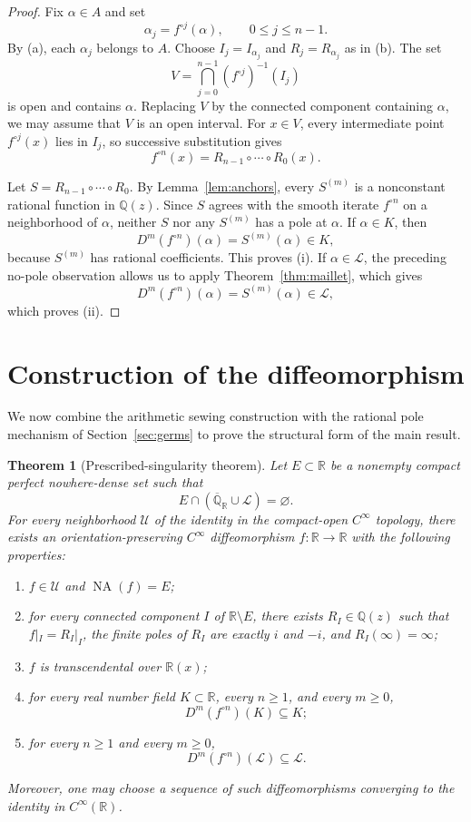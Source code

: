 \documentclass[11pt,reqno]{amsart}
\numberwithin{equation}{section}
\newtheorem{theorem}{Theorem}[section]
\theoremstyle{definition}
\theoremstyle{remark}
\newcommand{\R}{\mathbb R}
\newcommand{\Q}{\mathbb Q}
\newcommand{\Ralg}{\overline{\mathbb Q}_{\mathbb R}}
\newcommand{\Lio}{\mathscr L}
\newcommand{\NA}{\operatorname{NA}}
\begin{document}
\begin{proof}
Fix $\alpha\in A$ and set
\[
 \alpha_j=f^{\circ j}(\alpha),
 \qquad 0\leq j\leq n-1.
\]
By (a), each $\alpha_j$ belongs to $A$.  Choose $I_j=I_{\alpha_j}$ and $R_j=R_{\alpha_j}$ as in (b).  The set
\[
 V=\bigcap_{j=0}^{n-1}(f^{\circ j})^{-1}(I_j)
\]
is open and contains $\alpha$. Replacing $V$ by the connected component
containing $\alpha$, we may assume that $V$ is an open interval. For $x\in V$, every intermediate point $f^{\circ j}(x)$ lies in $I_j$, so successive substitution gives
\[
 f^{\circ n}(x)=R_{n-1}\circ\cdots\circ R_0(x).
\]

Let $S=R_{n-1}\circ\cdots\circ R_0$.  By Lemma~\ref{lem:anchors}, every $S^{(m)}$ is a nonconstant rational function in $\Q(z)$. Since $S$ agrees with the smooth iterate $f^{\circ n}$ on a neighborhood of $\alpha$, neither $S$ nor any $S^{(m)}$ has a pole at $\alpha$. If $\alpha\in K$, then
\[
 D^m(f^{\circ n})(\alpha)=S^{(m)}(\alpha)\in K,
\]
because $S^{(m)}$ has rational coefficients. This proves (i). If $\alpha\in\Lio$, the preceding no-pole observation allows us to apply Theorem~\ref{thm:maillet}, which gives
\[
 D^m(f^{\circ n})(\alpha)=S^{(m)}(\alpha)\in\Lio,
\]
which proves (ii).
\end{proof}

\section{Construction of the diffeomorphism}\label{sec:construction}

We now combine the arithmetic sewing construction with the rational
pole mechanism of Section~\ref{sec:germs} to prove the structural form
of the main result.

\begin{theorem}[Prescribed-singularity theorem]\label{thm:cloaking}
Let $E\subset\R$ be a nonempty compact perfect nowhere-dense set such that
\[
E\cap(\Ralg\cup\Lio)=\varnothing.
\]
For every neighborhood $\mathcal U$ of the identity in the compact-open $C^\infty$ topology, there exists an orientation-preserving $C^\infty$ diffeomorphism $f:\R\to\R$ with the following properties:
\begin{enumerate}[label=\textup{(\roman*)}]
\item $f\in\mathcal U$ and $\NA(f)=E$;
\item for every connected component $I$ of $\R\setminus E$, there exists $R_I\in\Q(z)$ such that $f|_I=R_I|_I$, the finite poles of $R_I$ are exactly $i$ and $-i$, and $R_I(\infty)=\infty$;
\item $f$ is transcendental over $\R(x)$;
\item for every real number field $K\subset\R$, every $n\geq1$, and every $m\geq0$,
\[
D^m(f^{\circ n})(K)\subseteq K;
\]
\item for every $n\geq1$ and every $m\geq0$,
\[
D^m(f^{\circ n})(\Lio)\subseteq\Lio.
\]
\end{enumerate}
Moreover, one may choose a sequence of such diffeomorphisms converging to the identity in $C^\infty(\R)$.
\end{theorem}
\end{document}
